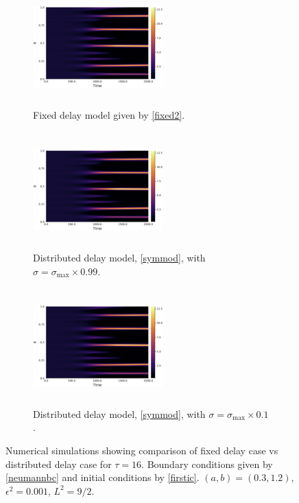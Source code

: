 \begin{figure}[H]
    \centering
    \begin{subfigure}[t]{0.32\textwidth}
        \centering
        \includegraphics[width=5cm,height=4.5cm]{dist2t16sigmax.png}
        \caption{Fixed delay model given by \eqref{fixed2}.}
        \label{}
    \end{subfigure}
    \hfill
    \begin{subfigure}[t]{0.32\textwidth}
        \centering
        \includegraphics[width=5cm,height=4.5cm]{dist2t16sigmax.png}
        \caption{Distributed delay model, \eqref{symmod}, with $\sigma=\sigma_{\max}\times0.99$.}
        \label{}
    \end{subfigure}
    \hfill
    \begin{subfigure}[t]{0.32\textwidth}
        \centering
        \includegraphics[width=5cm,height=4.5cm]{dist2t16sigmax.png}
        \caption{Distributed delay model, \eqref{symmod}, with $\sigma=\sigma_{\max}\times0.1$.}
        \label{}
    \end{subfigure}
    \caption{Numerical simulations showing comparison of fixed delay case vs distributed delay case for $\tau=16$. Boundary conditions given by \eqref{neumannbc} and initial conditions by \eqref{firstic}. $(a,b)=(0.3,1.2)$, $\epsilon^2=0.001$, $L^2=9/2$.}
    \label{fig:distres4}
\end{figure}




